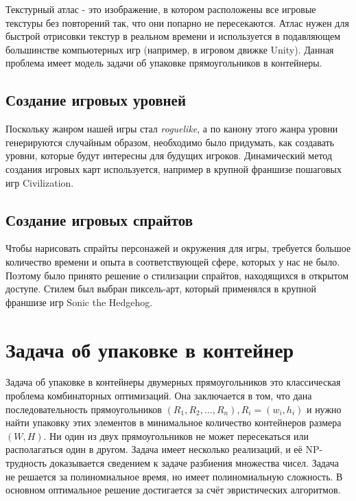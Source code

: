 \documentclass[a4paper,12pt]{report}
\begin{document}
Текстурный атлас - это изображение, в котором расположены все игровые текстуры без повторений так, что они попарно не пересекаются. Атлас нужен для быстрой отрисовки текстур в реальном времени и используется в подавляющем большинстве компьютерных игр (например, в игровом движке Unity\citep{unity}). Данная проблема имеет модель задачи об упаковке прямоугольников в контейнеры.

\section{Создание игровых уровней}

Поскольку жанром нашей игры стал \textit{roguelike}, а по канону этого жанра уровни генерируются случайным образом, необходимо было придумать, как создавать уровни, которые будут интересны для будущих игроков. Динамический метод создания игровых карт используется, например в крупной франшизе пошаговых игр Civilization\citep{civi}.

\section{Создание игровых спрайтов}

Чтобы нарисовать спрайты персонажей и окружения для игры, требуется большое количество времени и опыта в соответствующей сфере, которых у нас не было. Поэтому было принято решение о стилизации спрайтов, находящихся в открытом доступе. Стилем был выбран пиксель-арт, который применялся в крупной франшизе игр Sonic the Hedgehog\citep{sonic}.

\chapter{Задача об упаковке в контейнер} 

\parindent=1cm
Задача об упаковке в контейнеры \citep{Jylanki} двумерных прямоугольников это классическая проблема комбинаторных оптимизаций. Она заключается в том, что дана последовательность прямоугольников $(R_1, R_2, …, R_n), R_i = (w_i, h_i)$ и нужно найти упаковку этих элементов в минимальное количество контейнеров размера $(W, H)$. Ни один из двух прямоугольников не может пересекаться или располагаться один в другом. Задача имеет несколько реализаций, и её NP-трудность доказывается сведением к задаче разбиения множества чисел. Задача не решается за полиномиальное время, но имеет полиномиальную сложность. В основном оптимальное решение достигается за счёт эвристических алгоритмов.
\end{document}
